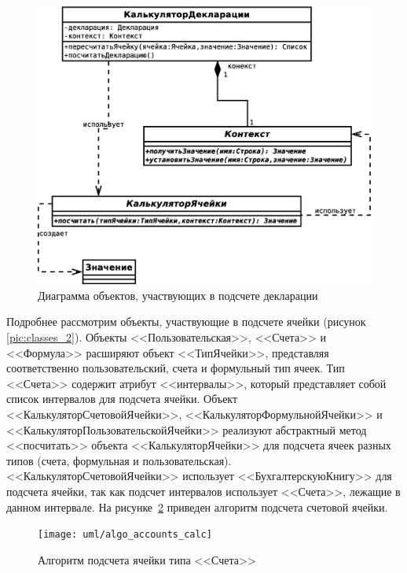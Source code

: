 \documentclass[14pt,a4paper]{reportmod}
\begin{document}
\begin{figure}
  \centering
  \includegraphics[scale=0.4]{uml/_classes_3}
  \caption{Диаграмма объектов, участвующих в подсчете декларации}
  \label{pic:classes_3}
\end{figure}

Подробнее рассмотрим объекты, участвующие в подсчете ячейки (рисунок \ref{pic:classes_2}). Объекты <<Пользовательская>>, <<Счета>> и <<Формула>> расширяют объект <<ТипЯчейки>>, представляя соответственно пользовательский, счета и формульный тип ячеек. Тип <<Счета>> содержит атрибут <<интервалы>>, который представляет собой список интервалов для подсчета ячейки. Объект <<КалькуляторСчетовойЯчейки>>, <<КалькуляторФормульнойЯчейки>> и <<КалькуляторПользовательскойЯчейки>> реализуют абстрактный метод <<посчитать>> объекта <<КалькуляторЯчейки>> для подсчета ячеек разных типов (счета, формульная и пользовательская). <<КалькуляторСчетовойЯчейки>> использует <<БухгалтерскуюКнигу>> для подсчета ячейки, так как подсчет интервалов использует <<Счета>>, лежащие в данном интервале. На рисунке~\ref{pic:algo_accounts} приведен алгоритм подсчета счетовой ячейки.

\begin{figure}
  \centering
  \texttt{[image: uml/algo\_accounts\_calc]}
  \caption{Алгоритм подсчета ячейки типа <<Счета>>}
  \label{pic:algo_accounts}
\end{figure}
\end{document}
